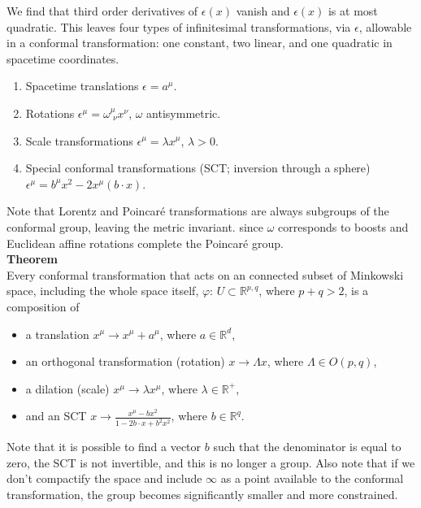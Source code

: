 \noindent We find that third order derivatives of $\epsilon(x)$ vanish and $\epsilon(x)$ is at most quadratic. This leaves four types of infinitesimal transformations, via $\epsilon$, allowable in a conformal transformation: one constant, two linear, and one quadratic in spacetime coordinates.

\begin{enumerate}
\item Spacetime translations
	\subitem $\epsilon = a^\mu$.
\item Rotations
	\subitem  $\epsilon^\mu = \omega^\mu_{\,\,\nu} x^\nu$, $\omega$ antisymmetric.
\item Scale transformations
	\subitem $\epsilon^\mu = \lambda x^\mu$, $\lambda > 0$.
\item Special conformal transformations (SCT; inversion through a sphere)
	\subitem $\epsilon^\mu = b^\mu x^2 - 2 x^\mu (b \cdot x)$.
\end{enumerate}

\noindent Note that Lorentz and Poincar\'e transformations are always subgroups of the conformal group, leaving the metric invariant. since $\omega$ corresponds to boosts and Euclidean affine rotations complete the Poincar\'e group. \\

\noindent \textbf{Theorem} \\

\noindent Every conformal transformation that acts on an connected subset of Minkowski space, including the whole space itself, $\varphi : \, U \subset \mathbb{R}^{p,q}$, where $p+q > 2$, is a composition of 

\begin{itemize}
\item a translation
	\subitem $x^\mu \rightarrow x^\mu + a^\mu$, where $a \in \mathbb{R}^d$,
\item an orthogonal transformation (rotation)
	\subitem $x \rightarrow \Lambda x$, where $\Lambda \in O(p,q)$,
\item a dilation (scale)
	\subitem $x^\mu \rightarrow \lambda x^\mu$, where $\lambda \in \mathbb{R}^+$,
\item and an SCT
	\subitem $x \rightarrow \frac{x^\mu - b x^2 }{1-2b \cdot x + b^2 x^2}$, where $b \in \mathbb{R}^q$.
\end{itemize}

\noindent Note that it is possible to find a vector $b$ such that the denominator is equal to zero, the SCT is not invertible, and this is no longer a group. Also note that if we don't compactify the space and include $\infty$ as a point available to the conformal transformation, the group becomes significantly smaller and more constrained. \\

